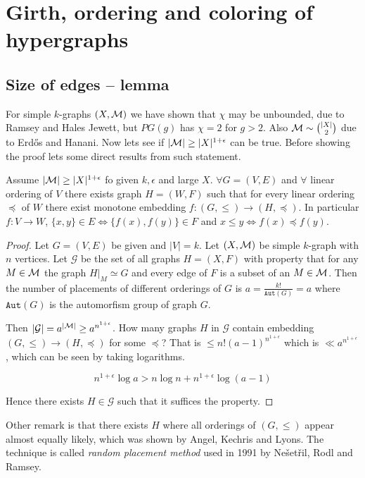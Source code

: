 \chapter{Girth, ordering and coloring of hypergraphs}

\section{Size of edges -- lemma}

For simple $k$-graphs $(X, \mathcal{M})$ we have shown that $\chi$ may be unbounded, due to Ramsey and Hales Jewett, but $PG(g)$ has $\chi = 2$ for $g > 2$. Also $\mathcal{M} \sim \binom{|X|}{2}$ due to Erd\H os and Hanani. Now lets see if $|\mathcal{M}| \geq |X|^{1 + \epsilon}$ can be true. Before showing the proof lets some direct results from such statement.

\begin{thm}
	Assume $|\mathcal{M}| \geq |X|^{1 + \epsilon}$ fo given $k, \epsilon$ and large $X$. $\forall G = (V,E)$ and $\forall$ linear ordering of $V$ there exists graph $H = (W,F)$ such that for every linear ordering $\preceq$ of $W$ there exist monotone embedding $f : (G, \leq) \to (H, \preceq)$. In particular $f : V \to W$, $\{x,y\} \in E \iff \{f(x), f(y)\} \in F$ and $x \leq y \iff f(x) \preceq f(y)$.
\end{thm}

\begin{proof}
	Let $G = (V,E)$ be given and $|V| = k$. Let $(X, \mathcal{M})$ be simple $k$-graph with $n$ vertices. Let $\mathcal{G}$ be the set of all graphs $H = (X,F)$ with property that for any $M \in \mathcal{M}$ the graph $H|_M \simeq G$ and every edge of $F$ is a subset of an $M \in \mathcal{M}$. Then the number of placements of different orderings of $G$ is $a = \frac{k!}{\mathtt{Aut}(G)} = a$ where $\mathtt{Aut}(G)$ is the automorfism group of graph $G$.
	
	Then $|\mathcal{G}| = a^{|\mathcal{M}|} \geq a^{n^{1+\epsilon}}$. How many graphs $H$ in $\mathcal{G}$ contain embedding $(G, \leq) \to (H, \preceq)$ for some $\preceq$? That is $\leq n! (a - 1)^{n^{1+\epsilon}}$ which is $\ll a^{n^{1+\epsilon}}$, which can be seen by taking logarithms.
	
	$$
	n^{1 + \epsilon} \log a > n \log n + n^{1 + \epsilon} \log(a-1)
	$$
	
	\noindent Hence there exists $H \in \mathcal{G}$ such that it suffices the property.
\end{proof}

Other remark is that there exists $H$ where all orderings of $(G, \leq)$ appear almost equally likely, which was shown by Angel, Kechris and Lyons. The technique is called \textit{random placement method} used in 1991 by Nešetřil, Rodl and Ramsey.

